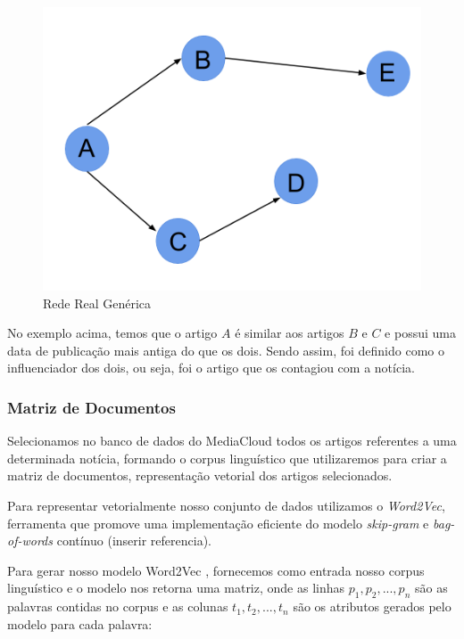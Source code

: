 \documentclass[a4paper,12pt]{article}
\begin{document}
\begin{figure}[h]
 \centering
 \includegraphics[scale=0.2]{./rede1.png}
 \caption{Rede Real Genérica}
\end{figure}

No exemplo acima, temos que o artigo $A$ é similar aos artigos $B$ e $C$ e possui uma data de publicação mais antiga do que os dois. 
Sendo assim, foi definido como o influenciador dos dois, ou seja, foi o artigo que os contagiou com a notícia.

\subsubsection{Matriz de Documentos}

Selecionamos no banco de dados do MediaCloud todos os artigos referentes a uma determinada notícia, formando o corpus linguístico que 
utilizaremos para criar a matriz de documentos, representação vetorial dos artigos selecionados.

Para representar vetorialmente nosso conjunto de dados utilizamos o \textit{Word2Vec}, ferramenta que promove uma implementação 
eficiente do modelo \textit{skip-gram} e \textit{bag-of-words} contínuo (inserir referencia).

Para gerar nosso modelo Word2Vec , fornecemos como entrada nosso corpus linguístico
e o modelo nos retorna uma matriz, onde as linhas $p_{1},p_{2},...,p_{n}$ são as palavras contidas no corpus e as colunas $t_{1},t_{2},...,t_{n}$
são os atributos gerados pelo modelo para cada palavra:
 
\end{document}
